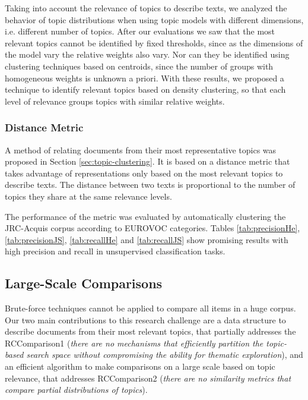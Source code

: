Taking into account the relevance of topics to describe texts, we analyzed the behavior of topic distributions when using topic models with different dimensions, i.e. different number of topics. After our evaluations we saw that the most relevant topics cannot be identified by fixed thresholds, since as the dimensions of the model vary the relative weights also vary. Nor can they be identified using clustering techniques based on centroids, since the number of groups with homogeneous weights is unknown a priori. With these results, we proposed a technique to identify relevant topics based on density clustering, so that each level of relevance groups topics with similar relative weights.

\subsubsection{Distance Metric}

A method of relating documents from their most representative topics was proposed in Section \ref{sec:topic-clustering}. It is based on a distance metric that takes advantage of representations only based on the most relevant topics to describe texts. The distance between two texts is proportional to the number of topics they share at the same relevance levels.

The performance of the metric was evaluated by automatically clustering the JRC-Acquis corpus according to EUROVOC categories. Tables \ref{tab:precisionHe}, \ref{tab:precisionJS}, \ref{tab:recallHe} and \ref{tab:recallJS} show promising results with high precision and recall in unsupervised classification tasks.


\subsection{Large-Scale Comparisons}

Brute-force techniques cannot be applied to compare all items in a huge corpus. Our two main contributions to this research challenge are a data structure to describe documents from their most relevant topics, that partially addresses the RCComparison1 (\textit{there are no mechanisms that efficiently partition the topic-based search space without compromising the ability for thematic exploration}), and an efficient algorithm to make comparisons on a large scale based on topic relevance, that addresses RCComparison2 (\textit{there are no similarity metrics that compare partial distributions of topics}).

